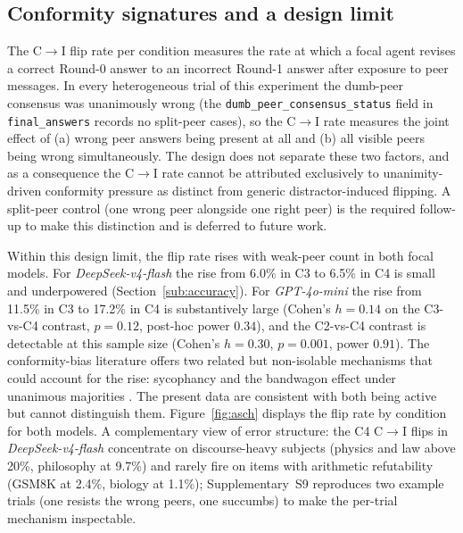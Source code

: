 \documentclass[review,3p,authoryear]{elsarticle}
\begin{document}
\subsection{Conformity signatures and a design limit}
\label{sub:asch}

The C$\rightarrow$I flip rate per condition measures the rate at which
a focal agent revises a correct Round-0 answer to an incorrect Round-1
answer after exposure to peer messages.
In every heterogeneous trial of this experiment the dumb-peer consensus
was unanimously wrong (the \texttt{dumb\_peer\_consensus\_status} field
in \texttt{final\_answers} records no split-peer cases), so the
C$\rightarrow$I rate measures the joint effect of (a) wrong peer answers
being present at all and (b) all visible peers being wrong
simultaneously.
The design does not separate these two factors, and as a consequence
the C$\rightarrow$I rate cannot be attributed exclusively to
unanimity-driven conformity pressure as distinct from generic
distractor-induced flipping.
A split-peer control (one wrong peer alongside one right peer) is the
required follow-up to make this distinction and is deferred to future
work.

Within this design limit, the flip rate rises with weak-peer count in
both focal models.
For \textit{DeepSeek-v4-flash} the rise from 6.0\% in C3 to 6.5\% in C4
is small and underpowered (Section~\ref{sub:accuracy}).
For \textit{GPT-4o-mini} the rise from 11.5\% in C3 to 17.2\% in C4 is
substantively large (Cohen's $h = 0.14$ on the C3-vs-C4 contrast,
$p = 0.12$, post-hoc power $0.34$), and the C2-vs-C4 contrast is
detectable at this sample size (Cohen's $h = 0.30$, $p = 0.001$,
power $0.91$).
The conformity-bias literature offers two related but non-isolable
mechanisms that could account for the rise: sycophancy
\citep{sharma2023towards} and the bandwagon effect under unanimous
majorities \citep{asch1951effects,bond1996culture,koo2024benchmarking}.
The present data are consistent with both being active but cannot
distinguish them.
Figure~\ref{fig:asch} displays the flip rate by condition for both
models.
A complementary view of error structure: the C4 C$\rightarrow$I flips
in \textit{DeepSeek-v4-flash} concentrate on discourse-heavy subjects
(physics and law above 20\%, philosophy at 9.7\%) and rarely fire on
items with arithmetic refutability (GSM8K at 2.4\%, biology at 1.1\%);
Supplementary~S9 reproduces two example trials (one resists the wrong
peers, one succumbs) to make the per-trial mechanism inspectable.
\end{document}
